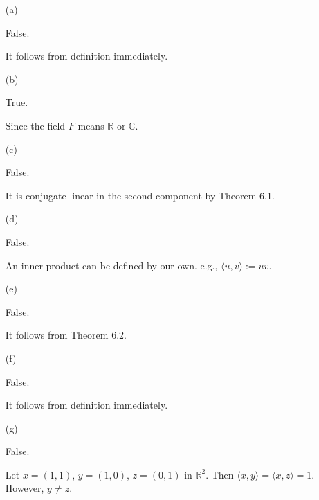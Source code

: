 \begin{Exercise}
	\begin{enumerate}[(a)]
		\item[(a)]
		\begin{answer}
			False.
		\end{answer}
		\begin{solution}
			It follows from definition immediately.
		\end{solution}
		
		\item[(b)]
		\begin{answer}
			True.
		\end{answer}
		\begin{solution}
			Since the field $F$ means $\mathbb{R}$ or $\mathbb{C}$.
		\end{solution}
		
		\item[(c)]
		\begin{answer}
			False.
		\end{answer}
		\begin{solution}
			It is conjugate linear in the second component by Theorem 6.1.
		\end{solution}
		
		\item[(d)]
		\begin{answer}
			False.
		\end{answer}
		\begin{solution}
			An inner product can be defined by our own. e.g., $\langle u,v\rangle := u v$.
		\end{solution}
		
		\item[(e)]
		\begin{answer}
			False.
		\end{answer}
		\begin{solution}
			It follows from Theorem 6.2.
		\end{solution}
		
		\item[(f)]
		\begin{answer}
			False.
		\end{answer}
		\begin{solution}
			It follows from definition immediately.
		\end{solution}
		
		\item[(g)]
		\begin{answer}
			False.
		\end{answer}
		\begin{solution}
			Let $x = (1,1)$, $y = (1, 0)$, $z=(0,1)$ in $\mathbb{R}^2$. Then $\langle x, y \rangle = \langle x,z \rangle = 1$. However, $y\neq z$.
		\end{solution}
		

\end{enumerate}
\end{Exercise}
